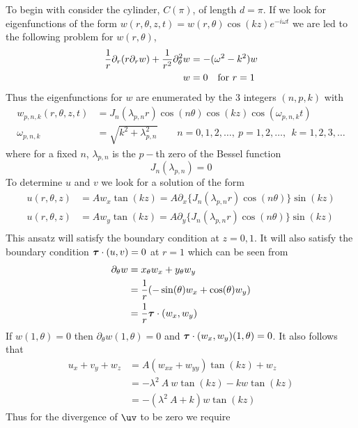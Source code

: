 \documentclass[10pt]{article}
\begin{document}
To begin with consider the cylinder, $C(\pi)$, of length $d=\pi$. 
If we look for eigenfunctions of the form $w(r,\theta,z,t) = w(r,\theta) \cos( k z ) e^{-i\omega t}$ we are led to the
following problem for $w(r,\theta)$,
\begin{align*}
  {1\over r}\partial_r( r \partial_r w ) + {1\over r^2} \partial_\theta^2 w &= -(\omega^2 - k^2) w \\
    w &=0 \quad\mbox{for $r=1$}
\end{align*}
Thus the eigenfunctions for $w$ are enumerated by the 3 integers $(n,p,k)$ with 
\begin{align*}
   w_{p,n,k}(r,\theta,z,t) & = J_n( \lambda_{p,n} r ) \cos(n \theta) \cos(k z) \cos(\omega_{p,n,k} t)
                   \\
       \omega_{p,n,k} &= \sqrt{k^2 + \lambda_{p,n}^2} \qquad n=0,1,2,\ldots,~p=1,2,\ldots,~~k=1,2,3,\ldots
\end{align*}
where for a fixed $n$, $\lambda_{p,n}$ is the $p-$th zero of the Bessel function
\[
     J_n(\lambda_{p,n})=0
\]
To determine $u$ and $v$ we look for a solution of the form
\begin{align*}
   u(r,\theta,z) &= A w_x \tan(kz) = A \partial_x\big\{ J_n( \lambda_{p,n} r ) \cos(n \theta)\big\} \sin(k z)  \\
   u(r,\theta,z) &= A w_y \tan(kz) = A \partial_y\big\{ J_n( \lambda_{p,n} r ) \cos(n \theta)\big\} \sin(k z) \\
\end{align*}
This ansatz will satisfy the boundary condition at $z=0,1$. It will also satisfy the boundary condition
$\boldsymbol{\tau}\cdot(u,v)=0$ at $r=1$ which can be seen from
\begin{align*}
   \partial_\theta w &= x_\theta w_x + y_\theta w_y \\
                     &= {1\over r} ( -\sin(\theta) w_x + \cos(\theta) w_y ) \\
                     &= {1\over r} \boldsymbol{\tau}\cdot(w_x,w_y )
\end{align*}
If $w(1,\theta)=0$ then $\partial_\theta w(1,\theta)=0$ and $\boldsymbol{\tau}\cdot(w_x,w_y )(1,\theta)=0$.
It also follows that 
\begin{align*}
    u_x + v_y + w_z &= A ( w_{xx} + w_{yy} ) \tan(kz) + w_z \\
              &= -\lambda^2 ~A~w \tan(kz) -k w \tan(kz) \\
              &= - (\lambda^2 ~A + k) w \tan(kz)
\end{align*}
Thus for the divergence of $\uv$ to be zero we require
\end{document}
